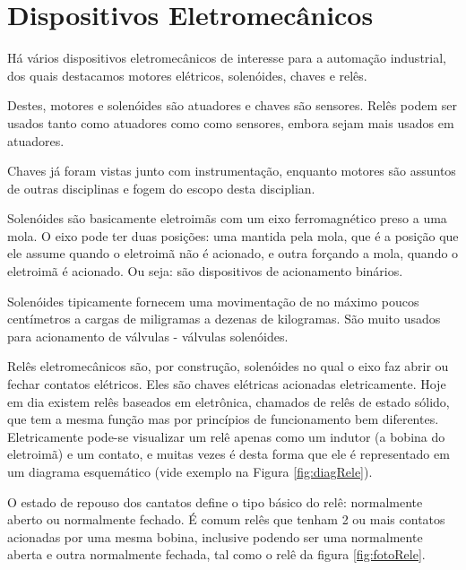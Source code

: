 \section{Dispositivos Eletromecânicos}

Há vários dispositivos eletromecânicos de interesse para a automação industrial, dos quais destacamos motores elétricos, solenóides, chaves e relês.

Destes, motores e solenóides são atuadores e chaves são sensores. Relês podem ser usados tanto como atuadores como como sensores, embora sejam mais usados em atuadores.

Chaves já foram vistas junto com instrumentação, enquanto motores são assuntos de outras disciplinas e fogem do escopo desta disciplian.

Solenóides são basicamente eletroimãs com um eixo ferromagnético preso a uma mola. O eixo pode ter duas posições: uma mantida pela mola, que é a posição que ele assume quando o eletroimã não é acionado, e outra forçando a mola, quando o eletroimã é acionado. Ou seja: são dispositivos de acionamento binários.

Solenóides tipicamente fornecem uma movimentação de no máximo poucos centímetros a cargas de miligramas a dezenas de kilogramas. São muito usados para acionamento de válvulas - válvulas solenóides.

Relês eletromecânicos são, por construção, solenóides no qual o eixo faz abrir ou fechar contatos elétricos. Eles são chaves elétricas acionadas eletricamente. Hoje em dia existem relês baseados em eletrônica, chamados de relês de estado sólido, que tem a mesma função mas por princípios de funcionamento bem diferentes. Eletricamente pode-se visualizar um relê apenas como um indutor (a bobina do eletroimã) e um contato, e muitas vezes é desta forma que ele é representado em um diagrama esquemático (vide exemplo na Figura \ref{fig:diagRele}).

O estado de repouso dos cantatos define o tipo básico do relê: normalmente aberto ou normalmente fechado. É comum relês que tenham 2 ou mais contatos acionadas por uma mesma bobina, inclusive podendo ser uma normalmente aberta e outra normalmente fechada, tal como o relê da figura \ref{fig:fotoRele}.


